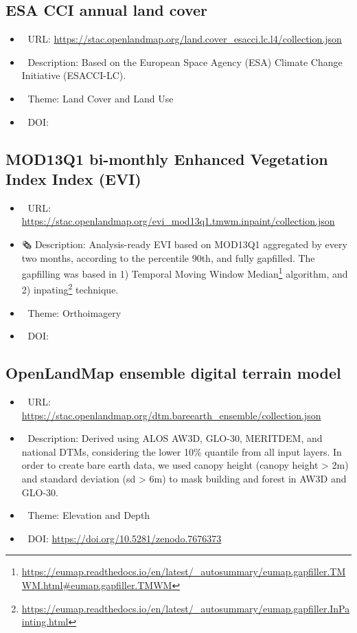 \documentclass[
  graybox,natbib,nospthms]{svmono}
\providecommand{\tightlist}{%
  \setlength{\itemsep}{0pt}\setlength{\parskip}{0pt}}
\providecommand{\tightlist}{\setlength{\itemsep}{0pt}\setlength{\parskip}{0pt}}
\renewcommand{\href}[2]{#2 (\url{#1})}
\renewcommand{\href}[2]{#2\footnote{\url{#1}}}
\begin{document}
\hypertarget{esa-cci-annual-land-cover}{%
\subsection{ESA CCI annual land cover}\label{esa-cci-annual-land-cover}}

\begin{itemize}
\tightlist
\item
  🔗 URL: \url{https://stac.openlandmap.org/land.cover_esacci.lc.l4/collection.json}
\item
  📰 Description: Based on the European Space Agency (ESA) Climate Change Initiative (ESACCI-LC).
\item
  📝 Theme: Land Cover and Land Use
\item
  📂 DOI:
\end{itemize}

\hypertarget{mod13q1-bi-monthly-enhanced-vegetation-index-index-evi}{%
\subsection{MOD13Q1 bi-monthly Enhanced Vegetation Index Index (EVI)}\label{mod13q1-bi-monthly-enhanced-vegetation-index-index-evi}}

\begin{itemize}
\tightlist
\item
  🔗 URL: \url{https://stac.openlandmap.org/evi_mod13q1.tmwm.inpaint/collection.json}
\item
  🗞 Description: Analysis-ready EVI based on MOD13Q1 aggregated by every two months, according to the percentile 90th, and fully gapfilled. The gapfilling was based in 1) \href{https://eumap.readthedocs.io/en/latest/_autosummary/eumap.gapfiller.TMWM.html\#eumap.gapfiller.TMWM}{Temporal Moving Window Median} algorithm, and 2) \href{https://eumap.readthedocs.io/en/latest/_autosummary/eumap.gapfiller.InPainting.html}{inpating} technique.
\item
  📝 Theme: Orthoimagery
\item
  📂 DOI:
\end{itemize}

\hypertarget{openlandmap-ensemble-digital-terrain-model}{%
\subsection{OpenLandMap ensemble digital terrain model}\label{openlandmap-ensemble-digital-terrain-model}}

\begin{itemize}
\tightlist
\item
  🔗 URL: \url{https://stac.openlandmap.org/dtm.bareearth_ensemble/collection.json}
\item
  📰 Description: Derived using ALOS AW3D, GLO-30, MERITDEM, and national DTMs, considering the lower 10\% quantile from all input layers. In order to create bare earth data, we used canopy height (canopy height \textgreater{} 2m) and standard deviation (sd \textgreater{} 6m) to mask building and forest in AW3D and GLO-30.
\item
  📝 Theme: Elevation and Depth
\item
  📂 DOI: \url{https://doi.org/10.5281/zenodo.7676373}
\end{itemize}
\end{document}
